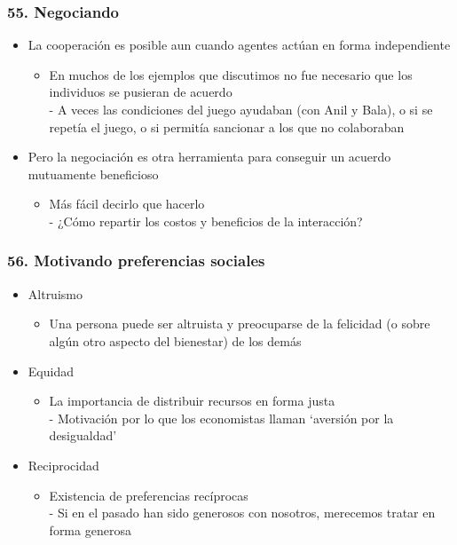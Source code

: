 \documentclass[14pt]{beamer}
\begin{document}
\begin{frame}
\frametitle{55. Negociando}
\begin{itemize}
    \item La cooperación es posible aun cuando agentes 
    actúan en forma independiente
    \begin{itemize}
        \item En muchos de los ejemplos que discutimos no fue necesario que los individuos se pusieran de acuerdo \\
        - A veces las condiciones del juego ayudaban (con Anil y Bala), o si se repetía el juego, o si permitía sancionar a los que no colaboraban
    \end{itemize}
    \item Pero la negociación es otra herramienta para conseguir un acuerdo mutuamente beneficioso
    \begin{itemize}
        \item Más fácil decirlo que hacerlo \\
        - ¿Cómo repartir los costos y beneficios de la interacción?
    \end{itemize}
\end{itemize}
\end{frame}

\begin{frame}
\frametitle{56. Motivando preferencias sociales}
\begin{itemize}
        \item Altruismo
        \begin{itemize}
            \item Una persona puede ser altruista y preocuparse de la felicidad (o sobre algún otro aspecto del bienestar) de los demás
        \end{itemize}
        \item Equidad
        \begin{itemize}
            \item La importancia de distribuir recursos en forma justa \\
            - Motivación por lo que los economistas llaman `aversión por la desigualdad'
        \end{itemize}
        \item Reciprocidad
        \begin{itemize}
            \item Existencia de preferencias recíprocas \\
            - Si en el pasado han sido generosos con nosotros, merecemos tratar en forma generosa
        \end{itemize}
\end{itemize}
\end{frame}
\end{document}
